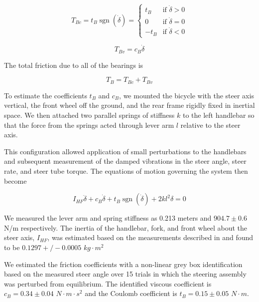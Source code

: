 \documentclass[a4paper]{article}
\begin{document}
\begin{equation}
  T_{Bc} = t_B \operatorname{sgn}(\dot\delta) =
  \begin{cases}
    t_B  & \textrm{if $\dot{\delta}>0$}\\
    0    & \textrm{if $\dot{\delta}=0$}\\
    -t_B & \textrm{if $\dot{\delta}<0$}
  \end{cases}
  \label{eq:coulomb}
\end{equation}

\begin{equation}
  \label{eq:viscous}
  T_{Bv} = c_B \dot{\delta}
\end{equation}

The total friction due to all of the bearings is

\begin{equation}
  T_B = T_{Bc} + T_{Bv}
\end{equation}

To estimate the coefficients $t_B$ and $c_B$, we mounted the bicycle with the
steer axis vertical, the front wheel off the ground, and the rear frame rigidly
fixed in inertial space. We then attached two parallel springs of stiffness $k$
to the left handlebar so that the force from the springs acted through lever
arm $l$ relative to the steer axis.

This configuration allowed application of small perturbations to the handlebars
and subsequent measurement of the damped vibrations in the steer angle, steer
rate, and steer tube torque. The equations of motion governing the system then
become

\begin{equation}
  I_{HF} \ddot{\delta} + c_B \dot{\delta} + t_B
  \operatorname{sgn}(\dot{\delta}) + 2 k l^2 \delta = 0
\end{equation}

We measured the lever arm and spring stiffness as 0.213 meters and $904.7 \pm
0.6$ N/m respectively. The inertia of the handlebar, fork, and front wheel
about the steer axis, $I_{HF}$, was estimated based on the measurements
described in \cite{Moore2012} and found to be $0.1297+/-0.0005$ $kg\cdot m^2$

We estimated the friction coefficients with a non-linear grey box
identification based on the measured steer angle over 15 trials in which the
steering assembly was perturbed from equilibrium. The identified viscous
coefficient is $c_B = 0.34 \pm 0.04$ $N \cdot m \cdot s^2$ and the Coulomb
coefficient is $t_B = 0.15 \pm 0.05$ $N \cdot m$.
\end{document}
